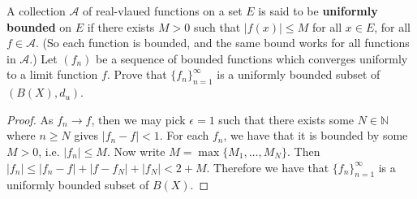 \documentclass[oneside]{amsart}
\theoremstyle{definition}
\newcommand{\nn}{\mathbb N}
\begin{document}
\begin{tcolorbox}[colback=black!5!white,colframe=black!75!black,title= Exercise $3.1.$]  A collection $\mathcal A$ of real-vlaued functions on a set $E$ is said to be \textbf{uniformly bounded} on $E$ if there exists $M > 0$ such that $|f(x)| \leq M$ for all $x \in E$, for all $f \in \mathcal A$. (So each function is bounded, and the same bound works for all functions in $\mathcal A$.) Let $(f_n)$ be a sequence of bounded functions which converges uniformly to a limit function $f$. Prove that $\{f_n \}_{n=1}^\infty$ is a uniformly bounded subset of $(B(X),d_u)$.
\tcblower 
\begin{proof} As $f_n \to f$, then we may pick $\epsilon = 1$ such that there exists some $N \in \nn$ where $n \geq N$ gives $|f_n - f| < 1$. For each $f_n$, we have that it is bounded by some $M > 0$, i.e. $|f_n| \leq M$. Now write $M = \max \{ M_1, \ldots, M_N\}$. Then $|f_n | \leq |f_n - f|+|f-f_N|+|f_N| < 2+M$. Therefore we have that $ \{ f_n \}_{n=1}^\infty$ is a uniformly bounded subset of $B(X)$.
\end{proof}
\end{tcolorbox}
\end{document}
